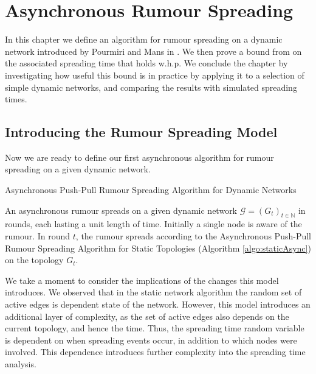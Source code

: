 \chapter{Asynchronous Rumour Spreading}
\label{chapter:AsyncUpperBound}

In this chapter we define an algorithm for rumour spreading on a dynamic network introduced by Pourmiri and Mans in \cite{asyncPaper}. We then prove a bound from \cite{asyncPaper} on the associated spreading time that holds w.h.p. We conclude the chapter by investigating how useful this bound is in practice by applying it to a selection of simple dynamic networks, and comparing the results with simulated spreading times. 

\section{Introducing the Rumour Spreading Model}
Now we are ready to define our first asynchronous algorithm for rumour spreading on a given dynamic network.

\begin{definition}
	Asynchronous Push-Pull Rumour Spreading Algorithm for Dynamic Networks
\end{definition}
\label{NodeCentricAsyncAlgorithm}

\noindent
An asynchronous rumour spreads on a given dynamic network $\mathcal{G} = (G_t)_{t\in \mathbb{N}}$ in rounds, each lasting a unit length of time. Initially a single node is aware of the rumour. In round $t$, the rumour spreads according to the Asynchronous Push-Pull Rumour Spreading Algorithm for Static Topologies (Algorithm \ref{algo:staticAsync}) on the topology $G_t$.

We take a moment to consider the implications of the changes this model introduces. We observed that in the static network algorithm the random set of active edges is dependent state of the network. However, this model introduces an additional layer of complexity, as the set of active edges also depends on the current topology, and hence the time. Thus, the spreading time random variable is dependent on when spreading events occur, in addition to which nodes were involved. This dependence introduces further complexity into the spreading time analysis.




